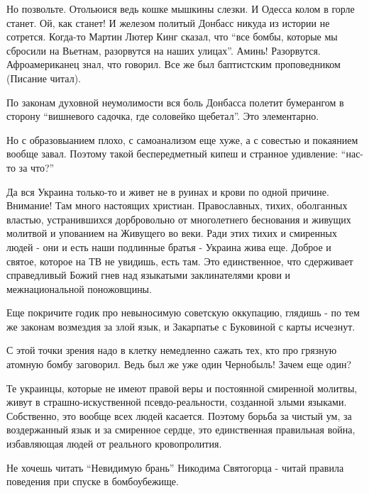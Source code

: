 Но позвольте. Отольюися ведь кошке мышкины слезки. И Одесса колом в горле
станет. Ой, как станет! И железом политый Донбасс никуда из истории не
сотрется. Когда-то Мартин Лютер Кинг сказал, что \enquote{все бомбы, которые мы
сбросили на Вьетнам, разорвутся на наших улицах}. Аминь! Разорвутся.
Афроамериканец знал, что говорил. Все же был баптистским проповедником (Писание
читал). 

По законам духовной неумолимости вся боль Донбасса полетит бумерангом в сторону
\enquote{вишневого садочка, где соловейко щебетал}. Это элементарно.

Но с образовыанием плохо, с самоанализом еще хуже, а с совестью и покаянием
вообще завал. Поэтому такой беспередметный кипеш и странное удивление: \enquote{нас-то
за что?}

Да вся Украина только-то и живет не в руинах и крови по одной причине.
Внимание! Там много настоящих христиан. Православных, тихих, оболганных
властью, устранившихся дорбровольно от многолетнего беснования и живущих
молитвой и упованием на Живущего во веки. Ради этих тихих и смиренных людей -
они и есть наши подлинные братья - Украина жива еще. Доброе и святое, которое
на ТВ не увидишь, есть там. Это единственное, что сдерживает справедливый Божий
гнев над языкатыми заклинателями крови и межнациональной поножовщины.

Еще покричите годик про невыносимую советскую оккупацию, глядишь - по тем же
законам возмездия за злой язык, и Закарпатье с Буковиной с карты исчезнут. 

С этой точки зрения надо в клетку немедленно сажать тех, кто про грязную
атомную бомбу заговорил. Ведь был же уже один Чернобыль! Зачем еще один? 

Те украинцы, которые не имеют правой веры и постоянной смиренной молитвы, живут
в страшно-искуственной псевдо-реальности, созданной злыми языками. Собственно,
это вообще всех людей касается. Поэтому борьба за чистый ум, за воздержанный
язык и за смиренное сердце, это единственная правильная война, избавляющая
людей от реального кровопролития. 

Не хочешь читать \enquote{Невидимую брань} Никодима Святогорца - читай правила
поведения при спуске в бомбоубежище.
